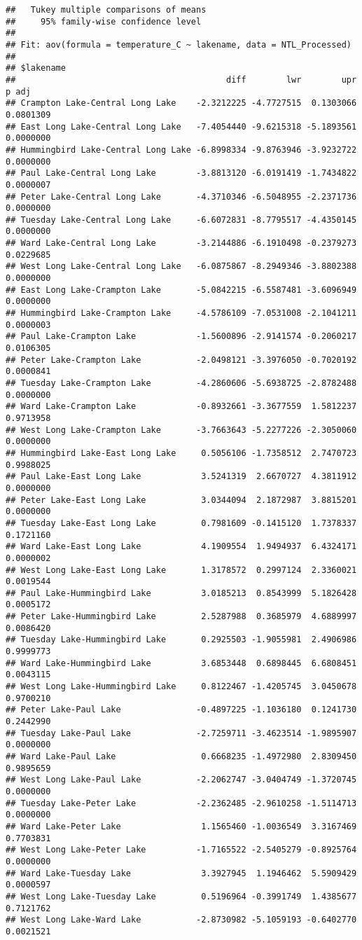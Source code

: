 \documentclass[
]{article}
\begin{document}
\begin{verbatim}
##   Tukey multiple comparisons of means
##     95% family-wise confidence level
## 
## Fit: aov(formula = temperature_C ~ lakename, data = NTL_Processed)
## 
## $lakename
##                                          diff        lwr        upr     p adj
## Crampton Lake-Central Long Lake    -2.3212225 -4.7727515  0.1303066 0.0801309
## East Long Lake-Central Long Lake   -7.4054440 -9.6215318 -5.1893561 0.0000000
## Hummingbird Lake-Central Long Lake -6.8998334 -9.8763946 -3.9232722 0.0000000
## Paul Lake-Central Long Lake        -3.8813120 -6.0191419 -1.7434822 0.0000007
## Peter Lake-Central Long Lake       -4.3710346 -6.5048955 -2.2371736 0.0000000
## Tuesday Lake-Central Long Lake     -6.6072831 -8.7795517 -4.4350145 0.0000000
## Ward Lake-Central Long Lake        -3.2144886 -6.1910498 -0.2379273 0.0229685
## West Long Lake-Central Long Lake   -6.0875867 -8.2949346 -3.8802388 0.0000000
## East Long Lake-Crampton Lake       -5.0842215 -6.5587481 -3.6096949 0.0000000
## Hummingbird Lake-Crampton Lake     -4.5786109 -7.0531008 -2.1041211 0.0000003
## Paul Lake-Crampton Lake            -1.5600896 -2.9141574 -0.2060217 0.0106305
## Peter Lake-Crampton Lake           -2.0498121 -3.3976050 -0.7020192 0.0000841
## Tuesday Lake-Crampton Lake         -4.2860606 -5.6938725 -2.8782488 0.0000000
## Ward Lake-Crampton Lake            -0.8932661 -3.3677559  1.5812237 0.9713958
## West Long Lake-Crampton Lake       -3.7663643 -5.2277226 -2.3050060 0.0000000
## Hummingbird Lake-East Long Lake     0.5056106 -1.7358512  2.7470723 0.9988025
## Paul Lake-East Long Lake            3.5241319  2.6670727  4.3811912 0.0000000
## Peter Lake-East Long Lake           3.0344094  2.1872987  3.8815201 0.0000000
## Tuesday Lake-East Long Lake         0.7981609 -0.1415120  1.7378337 0.1721160
## Ward Lake-East Long Lake            4.1909554  1.9494937  6.4324171 0.0000002
## West Long Lake-East Long Lake       1.3178572  0.2997124  2.3360021 0.0019544
## Paul Lake-Hummingbird Lake          3.0185213  0.8543999  5.1826428 0.0005172
## Peter Lake-Hummingbird Lake         2.5287988  0.3685979  4.6889997 0.0086420
## Tuesday Lake-Hummingbird Lake       0.2925503 -1.9055981  2.4906986 0.9999773
## Ward Lake-Hummingbird Lake          3.6853448  0.6898445  6.6808451 0.0043115
## West Long Lake-Hummingbird Lake     0.8122467 -1.4205745  3.0450678 0.9700210
## Peter Lake-Paul Lake               -0.4897225 -1.1036180  0.1241730 0.2442990
## Tuesday Lake-Paul Lake             -2.7259711 -3.4623514 -1.9895907 0.0000000
## Ward Lake-Paul Lake                 0.6668235 -1.4972980  2.8309450 0.9895659
## West Long Lake-Paul Lake           -2.2062747 -3.0404749 -1.3720745 0.0000000
## Tuesday Lake-Peter Lake            -2.2362485 -2.9610258 -1.5114713 0.0000000
## Ward Lake-Peter Lake                1.1565460 -1.0036549  3.3167469 0.7703831
## West Long Lake-Peter Lake          -1.7165522 -2.5405279 -0.8925764 0.0000000
## Ward Lake-Tuesday Lake              3.3927945  1.1946462  5.5909429 0.0000597
## West Long Lake-Tuesday Lake         0.5196964 -0.3991749  1.4385677 0.7121762
## West Long Lake-Ward Lake           -2.8730982 -5.1059193 -0.6402770 0.0021521
\end{verbatim}
\end{document}
